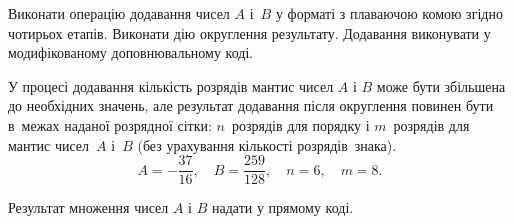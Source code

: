 \documentclass[a4paper,oneside,DIV=12,12pt]{scrartcl}
\begin{document}
	\begin{exercise}
		Виконати операцію додавання чисел $A$ і~$B$ у форматі з плаваючою комою згідно чотирьох етапів. Виконати дію округлення результату. Додавання виконувати у модифікованому доповнювальному коді.
		
		У процесі додавання кількість розрядів мантис чисел $A$ і $B$ може бути збільшена до необхідних значень, але результат додавання після округлення повинен бути в~межах наданої розрядної сітки: $n$~розрядів для порядку і $m$~розрядів для мантис чисел~$A$ і~$B$ (без урахування кількості розрядів~знака).
		\[
			A = -\frac{37}{16}, \quad
			B = \frac{259}{128}, \quad
			n = 6, \quad
			m = 8.
		\]
		
		Результат множення чисел $A$ і $B$ надати у прямому коді. 
	\end{exercise}
	
\end{document}
